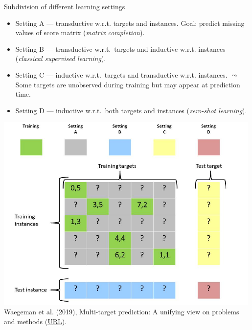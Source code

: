 \documentclass[11pt,compress,t,notes=noshow, xcolor=table]{beamer}
\begin{document}
\begin{frame}{Subdivision of different learning settings}

	\begin{itemize}
		\item Setting A --- transductive w.r.t. targets and instances. Goal: predict missing values of score matrix (\emph{matrix completion}).

		\item Setting B --- transductive w.r.t.\ targets and inductive w.r.t. instances (\emph{classical supervised learning}).

	\end{itemize}

	\begin{minipage}{0.55\textwidth}
		\begin{itemize}
			\item Setting C --- inductive w.r.t.\ targets and transductive w.r.t. instances. $\leadsto$ Some targets are unobserved during training but may appear at prediction time.

			\item Setting D --- inductive w.r.t.\ both targets and instances (\emph{zero-shot learning}).
            
		\end{itemize}
	\end{minipage}
    \hfill
	\begin{minipage}{0.4\textwidth}
	   \center
	   \includegraphics[width=0.99\textwidth,trim = 0 0 50 0,clip]{figure/Slide16}  \tiny
	   \\ Waegeman et al. (2019), Multi-target prediction: A unifying view on problems and methods (\href{https://arxiv.org/pdf/1809.02352.pdf}{\underline{URL}}).
	\end{minipage}
\end{frame}



%
\endlecture
\end{document}
